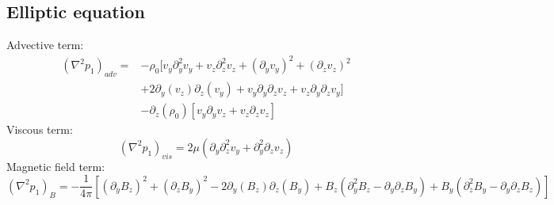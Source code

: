 \documentclass{article}
\begin{document}
\subsection{Elliptic equation}
Advective term:\\
\begin{align*}
    (\nabla^2 p_1)_{adv} =&- \rho_0 [ v_y\partial_y^2 v_y + v_z\partial_z^2 v_z + \left( \partial_y v_y \right)^2 + \left( \partial_z v_z\right)^2\\
                   &+ 2\partial_y(v_z)\partial_z(v_y) + v_y\partial_y\partial_z v_z + v_z\partial_y\partial_z v_y]\\
                    &- \partial_z \left(\rho_0\right)\left[ v_y\partial_y v_z + v_z\partial_z v_z \right]
\end{align*}
Viscous term:\\
\begin{equation}
    (\nabla^2 p_1)_{vis} = 2\mu(\partial_y\partial_z^2v_y+\partial_y^2\partial_zv_z)
\end{equation}
Magnetic field term:\\
\begin{equation}
    (\nabla^2 p_1)_{B} = -\frac{1}{4\pi}\left[ (\partial_y B_z)^2+(\partial_z B_y)^2 - 2\partial_y(B_z)\partial_z(B_y)+B_z(\partial_y^2B_z-\partial_y\partial_z B_y)+B_y(\partial_z^2B_y-\partial_y\partial_z B_z)  \right]
\end{equation}
\end{document}
